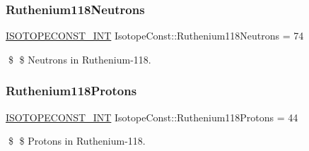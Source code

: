 \subsubsection{\texorpdfstring{Ruthenium118\+Neutrons}{Ruthenium118Neutrons}}
{\footnotesize\ttfamily \mbox{\hyperlink{group___isotope_const-_macros_ga5f18360b3e99483a35c32d789e62621c}{I\+S\+O\+T\+O\+P\+E\+C\+O\+N\+S\+T\+\_\+\+I\+NT}} Isotope\+Const\+::\+Ruthenium118\+Neutrons = 74}

\$ \$ Neutrons in Ruthenium-\/118. \mbox{\label{group___isotope_const-_ruthenium-_ru118_gaad5b89715b5fe0d48e4478032b8cc4ba}} 
\subsubsection{\texorpdfstring{Ruthenium118\+Protons}{Ruthenium118Protons}}
{\footnotesize\ttfamily \mbox{\hyperlink{group___isotope_const-_macros_ga5f18360b3e99483a35c32d789e62621c}{I\+S\+O\+T\+O\+P\+E\+C\+O\+N\+S\+T\+\_\+\+I\+NT}} Isotope\+Const\+::\+Ruthenium118\+Protons = 44}

\$ \$ Protons in Ruthenium-\/118. 